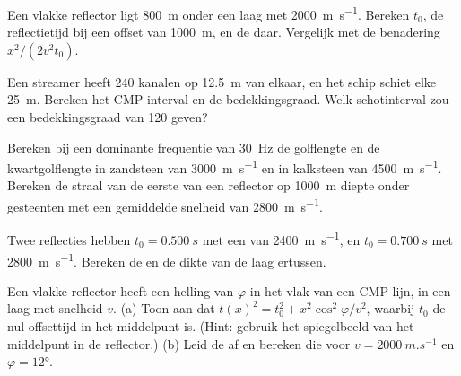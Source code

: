 \begin{exercise}[$\star$]\label{exo:b3:exploration-seismology:2}
Een vlakke reflector ligt \qty{800}{m} onder een laag met \qty{2000}{m.s^{-1}}.
Bereken $t_0$, de reflectietijd bij een offset van \qty{1000}{m}, en de  daar. Vergelijk met de benadering $x^2/(2v^2t_0)$.
\end{exercise}

\begin{exercise}[$\star$]\label{exo:b3:exploration-seismology:3}
Een streamer heeft 240 kanalen op \qty{12.5}{m} van elkaar, en het schip schiet elke
\qty{25}{m}. Bereken het CMP-interval en de bedekkingsgraad. Welk schotinterval zou
een bedekkingsgraad van 120 geven?
\end{exercise}

\begin{exercise}[$\star$]\label{exo:b3:exploration-seismology:4}
Bereken bij een dominante frequentie van \qty{30}{Hz} de golflengte en de
kwartgolflengte in zandsteen van \qty{3000}{m.s^{-1}} en in kalksteen van
\qty{4500}{m.s^{-1}}. Bereken de straal van de eerste  van een
reflector op \qty{1000}{m} diepte onder gesteenten met een gemiddelde snelheid van \qty{2800}{m.s^{-1}}.
\end{exercise}

\begin{exercise}[$\star\star$]\label{exo:b3:exploration-seismology:5}
Twee reflecties hebben $t_0 = \qty{0.500}{s}$ met een  van
\qty{2400}{m.s^{-1}}, en $t_0 = \qty{0.700}{s}$ met \qty{2800}{m.s^{-1}}.
Bereken de  en de dikte van de laag ertussen.
\end{exercise}

\begin{exercise}[$\star\star$]\label{exo:b3:exploration-seismology:6}
Een vlakke reflector heeft een helling van $\varphi$ in het vlak van een CMP-lijn, in een laag met
snelheid $v$. (a) Toon aan dat $t(x)^2 = t_0^2 + x^2\cos^2\varphi/v^2$, waarbij $t_0$
de nul-offsettijd in het middelpunt is. (Hint: gebruik het spiegelbeeld van het middelpunt in
de reflector.) (b) Leid de  af en bereken die voor
$v = \qty{2000}{m.s^{-1}}$ en $\varphi = \ang{12}$.
\end{exercise}

